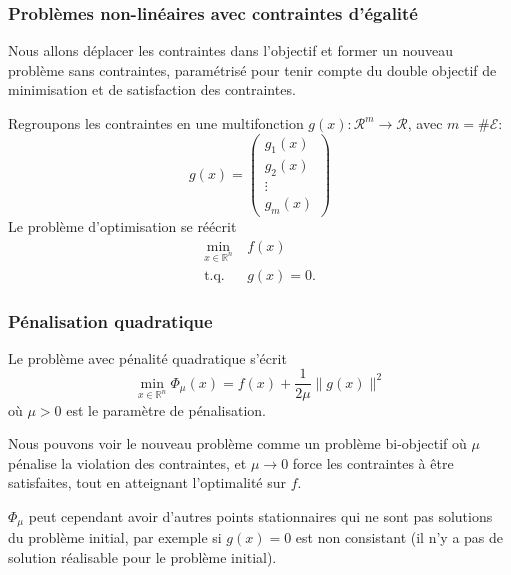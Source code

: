 \documentclass[t,usepdftitle=false]{beamer}
\def\cE{\mathcal{E}}
\def\cR{\mathcal{R}}
\def\RR{\mathbb{R}}
\begin{document}
\begin{frame}
\frametitle{Problèmes non-linéaires avec contraintes d'égalité}

Nous allons déplacer les contraintes dans l'objectif et former un nouveau problème sans contraintes, paramétrisé pour tenir compte du double objectif de minimisation et de satisfaction des contraintes.

\mbox{}

Regroupons les contraintes en une multifonction $g(x): \cR^m \rightarrow \cR$, avec $m = \#\cE$:
$$
g(x) = \begin{pmatrix} g_1(x) \\ g_2(x) \\ \vdots \\ g_m(x) \end{pmatrix}
$$
Le problème d'optimisation se réécrit
\begin{align*}
\min_{x \in \RR^n}\ & f(x) \\
\mbox{t.q. } &g(x) = 0.
\end{align*}

\end{frame}

\begin{frame}
\frametitle{Pénalisation quadratique}

Le problème avec pénalité quadratique s'écrit
$$
\min_{x \in \RR^n} \Phi_{\mu}(x) = f(x) + \frac{1}{2\mu} \| g(x) \|^2
$$
où $\mu > 0$ est le paramètre de pénalisation.

\mbox{}

Nous pouvons voir le nouveau problème comme un problème bi-objectif où $\mu$ pénalise la violation des contraintes, et $\mu \rightarrow 0$ force les contraintes à être satisfaites, tout en atteignant l'optimalité sur $f$.

\mbox{}

$\Phi_{\mu}$ peut cependant avoir d'autres points stationnaires qui ne sont pas solutions du problème initial, par exemple si $g(x) = 0$ est non consistant (il n'y a pas de solution réalisable pour le problème initial).

\end{frame}
\end{document}
